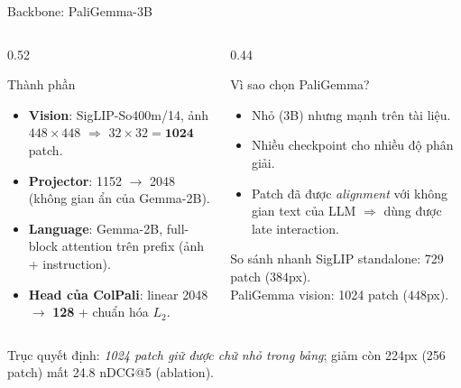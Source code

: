 \documentclass[aspectratio=169,10pt]{beamer}
\begin{document}
\begin{frame}{Backbone: PaliGemma-3B}
  \begin{columns}[T]
    \begin{column}{0.52\textwidth}
      \begin{block}{\small Thành phần}
        \footnotesize
        \begin{itemize}
          \item \textbf{Vision}: SigLIP-So400m/14, ảnh $448\times448$ $\Rightarrow$ $32\times32=\mathbf{1024}$ patch.
          \item \textbf{Projector}: 1152 $\rightarrow$ 2048 (không gian ẩn của Gemma-2B).
          \item \textbf{Language}: Gemma-2B, full-block attention trên prefix (ảnh + instruction).
          \item \textbf{Head của ColPali}: linear 2048 $\rightarrow$ \textbf{128} + chuẩn hóa $L_2$.
        \end{itemize}
      \end{block}
    \end{column}
    \begin{column}{0.44\textwidth}
      \begin{block}{\small Vì sao chọn PaliGemma?}
        \footnotesize
        \begin{itemize}
          \item Nhỏ (3B) nhưng mạnh trên tài liệu.
          \item Nhiều checkpoint cho nhiều độ phân giải.
          \item Patch đã được \emph{alignment} với không gian text của LLM $\Rightarrow$ dùng được late interaction.
        \end{itemize}
      \end{block}
      \begin{block}{\small So sánh nhanh}
        \footnotesize
        SigLIP standalone: 729 patch ($384$px).\\
        PaliGemma vision: 1024 patch ($448$px).
      \end{block}
    \end{column}
  \end{columns}

  \vspace{2mm}
  \begin{center}
    \footnotesize
    Trục quyết định: \emph{1024 patch giữ được chữ nhỏ trong bảng}; giảm còn 224px (256 patch) mất 24.8 nDCG@5 (ablation).
  \end{center}
\end{frame}
\end{document}
